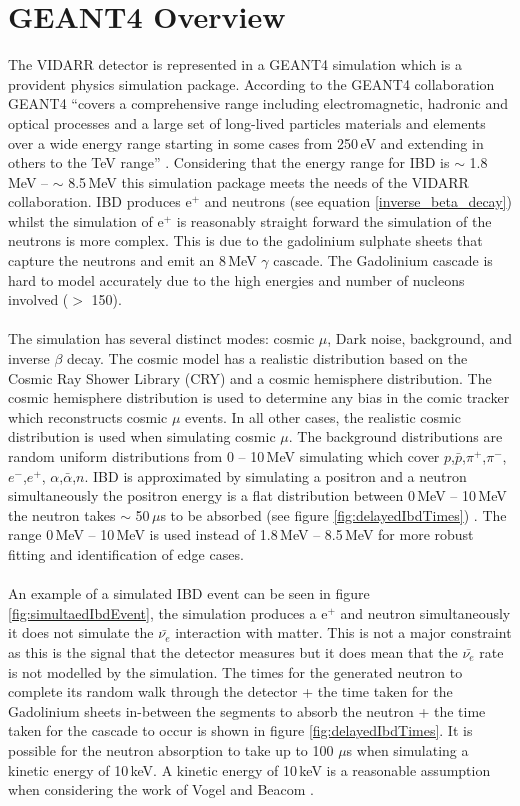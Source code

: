 \section{GEANT4 Overview}\label{sec:GEANT4Simulation_g4Overview}
The VIDARR detector is represented in a GEANT4 simulation which is a provident physics simulation package. According to the GEANT4 collaboration GEANT4 ``covers a comprehensive range including electromagnetic, hadronic and optical processes and a large set of long-lived particles materials and elements over a wide energy range starting in some cases from 250\,eV and extending in others to the TeV range'' \cite{Agostinelli:2002hh}. Considering that the energy range for IBD is $\sim$ 1.8\,MeV -- $\sim$ 8.5\,MeV \cite{Mueller_2011} this simulation package meets the needs of the VIDARR collaboration. IBD produces e$^+$ and neutrons (see equation \ref{inverse_beta_decay}) whilst the simulation of e$^+$ is reasonably straight forward the simulation of the neutrons is more complex. This is due to the gadolinium sulphate sheets that capture the neutrons and emit an 8\,MeV $\gamma$ cascade. The Gadolinium cascade is hard to model accurately due to the high energies and number of nucleons involved ($>$ 150).
\\\\The simulation has several distinct modes: cosmic $\mu$, Dark noise, background, and inverse $\beta$ decay. The cosmic model has a realistic distribution based on the Cosmic Ray Shower Library (CRY) \cite{ieee_cry_2007} and a cosmic hemisphere distribution. The cosmic hemisphere distribution is used to determine any bias in the comic tracker which reconstructs cosmic $\mu$ events. In all other cases, the realistic cosmic distribution is used when simulating cosmic $\mu$. The background distributions are random uniform distributions from 0 -- 10\,MeV simulating which cover $p$,$\bar{p}$,$\pi^+$,$\pi^-$,$e^-$,$e^+$, $\alpha$,$\bar{\alpha}$,$n$. IBD is approximated by simulating a positron and a neutron simultaneously the positron energy is a flat distribution between 0\,MeV -- 10\,MeV the neutron takes $\sim$ 50\,$\mu$s to be absorbed (see figure \ref{fig:delayedIbdTimes}) . The range 0\,MeV -- 10\,MeV is used instead of 1.8\,MeV -- 8.5\,MeV for more robust fitting and identification of edge cases.
\\\\An example of a simulated IBD event can be seen in figure \ref{fig:simultaedIbdEvent}, the simulation produces a e$^+$ and neutron simultaneously it does not simulate the $\bar{\nu_e}$ interaction with matter. This is not a major constraint as this is the signal that the detector measures but it does mean that the $\bar{\nu_e}$ rate is not modelled by the simulation. The times for the generated neutron to complete its random walk through the detector + the time taken for the Gadolinium sheets in-between the segments to absorb the neutron + the time taken for the cascade to occur is shown in figure \ref{fig:delayedIbdTimes}. It is possible for the neutron absorption to take up to 100 $\mu$s when simulating a kinetic energy of 10\,keV. A kinetic energy of 10\,keV is a reasonable assumption when considering the work of Vogel and Beacom \cite{Vogel_1999}. 



